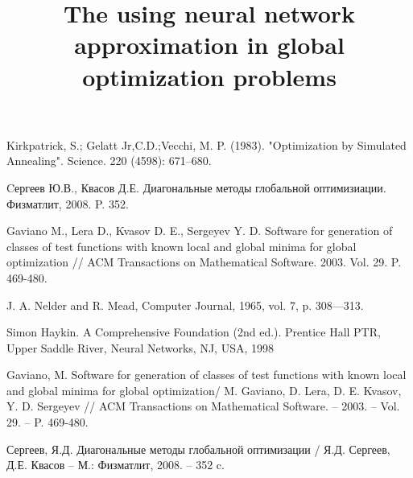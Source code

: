 \documentclass[11pt, oneside, a4paper]{article}
\begin{document}
\begin{biblio}
Kirkpatrick, S.; Gelatt Jr,C.D.;Vecchi, M. P. (1983). "Optimization by Simulated Annealing". Science. 220 (4598): 671–680.

Cергеев Ю.В., Квасов Д.Е. Диагональные  методы глобальной оптимизиации. Физматлит, 2008. P. 352.

Gaviano M., Lera D., Kvasov D. E., Sergeyev Y. D. Software for generation of classes of test functions with known local and global minima for global optimization // ACM Transactions on Mathematical Software. 2003. Vol. 29. P. 469-480.

J. A. Nelder and R. Mead, Computer Journal, 1965, vol. 7, p. 308—313.

Simon Haykin. A Comprehensive Foundation (2nd ed.). Prentice Hall PTR, Upper
Saddle River, Neural Networks, NJ, USA, 1998 


Gaviano, M. Software for generation of classes of test functions with known local and global minima for global optimization/ M. Gaviano, D. Lera, D. E. Kvasov, Y. D. Sergeyev // ACM Transactions on Mathematical Software. – 2003. – Vol.  29. – P. 469-480.

Сергеев, Я.Д. Диагональные методы глобальной оптимизации / Я.Д. Сергеев, Д.Е. Квасов – М.: Физматлит, 2008. – 352 c.

\end{biblio}


\newpage


\title{The using neural network approximation in global optimization problems}




\end{document}
